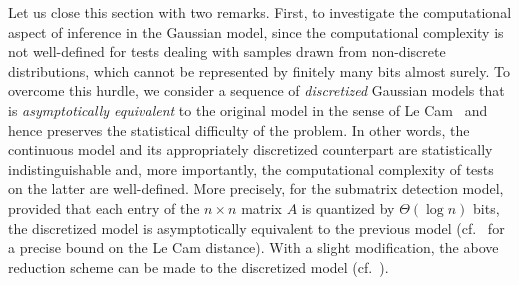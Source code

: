 Let us close this section with two remarks. First, to investigate the computational aspect of inference in the Gaussian model, since the computational complexity is not well-defined for tests dealing with samples drawn from non-discrete distributions, which cannot be represented by finitely many bits almost surely. 
To overcome this hurdle, we consider a sequence of \emph{discretized} Gaussian models that is \emph{asymptotically equivalent} to the original model in the sense of Le Cam~\cite{Lecam86} and hence preserves the statistical difficulty of the problem. 
In other words, the continuous model and its appropriately discretized counterpart are statistically indistinguishable and, more importantly, the computational complexity of tests on the latter are well-defined. More precisely, for the submatrix detection model, provided that each entry of the $n\times n$ matrix $A$ is quantized by $\Theta(\log n)$ bits, the discretized model is asymptotically equivalent to the previous model (cf.~\cite[Section 3 and Theorem 1]{ma2013submatrix} for a precise bound on the Le Cam distance).
With a slight modification, the above reduction scheme can be made to the discretized model (cf.~\cite[Section 4.2]{ma2013submatrix}).



